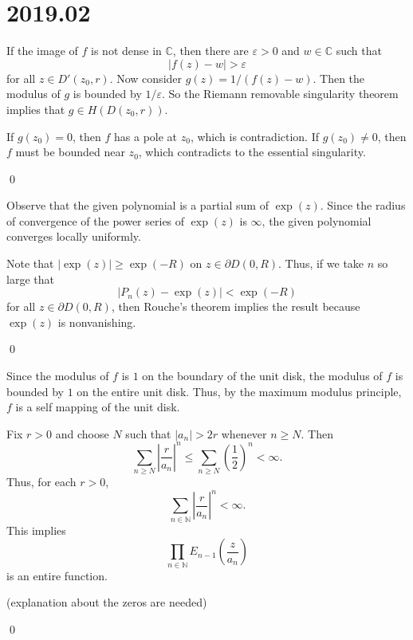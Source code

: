 \section*{2019.02}
\begin{problem}

	If the image of $f$ is not dense in $\mathbb{C}$, then there are $\varepsilon >0$ and $w \in \mathbb{C}$ such that
	\[
		\lvert f(z) - w \lvert > \varepsilon
	\]
	for all $z \in D'(z_0, r)$.
	Now consider $g(z) = 1/(f(z) - w)$.
	Then the modulus of $g$ is bounded by $1/\varepsilon$.
	So the Riemann removable singularity theorem implies that $g \in H(D(z_0, r))$.

	If $g(z_0) = 0$, then $f$ has a pole at $z_0$, which is contradiction.
	If $g(z_0) \ne 0$, then $f$ must be bounded near $z_0$, which contradicts to the essential singularity.

	\qed
\end{problem}

\begin{problem}
	
	Observe that the given polynomial is a partial sum of $\exp(z)$.
	Since the radius of convergence of the power series of $\exp(z)$ is $\infty$,
	the given polynomial converges locally uniformly.

	Note that $ \lvert \exp(z) \lvert \geq \exp(-R)$ on $z \in \partial D(0, R)$.
	Thus, if we take $n$ so large that 
	\[
		\lvert P_n(z) - \exp(z) \lvert < \exp(-R)
	\]
	for all $z \in \partial D(0, R)$, then Rouche's theorem implies the result because $\exp(z)$ is nonvanishing.

	\qed
\end{problem}

\begin{problem}
	
	Since the modulus of $f$ is $1$ on the boundary of the unit disk, the modulus of $f$ is bounded by $1$ on the entire unit disk.
	Thus, by the maximum modulus principle, $f$ is a self mapping of the unit disk.
\end{problem}

\begin{problem}
	
	Fix $r>0$ and choose $N$ such that $\lvert a_n \lvert > 2r$ whenever $n \geq N$.
	Then
	\[
		\sum_{n\geq N} \left \lvert \frac{r}{a_n} \right \lvert ^n \leq \sum_{n\geq N} \left( \frac{1}{2} \right)^n < \infty.
	\]
	Thus, for each $r>0$,
	\[
		\sum_{n \in \mathbb{N}} \left \lvert \frac{r}{a_n} \right \lvert ^n < \infty.
	\]
	This implies
	\[
		\prod_{n \in \mathbb{N}} E_{n-1}\left( \frac{z}{a_n} \right)
	\]
	is an entire function.

	(explanation about the zeros are needed)

	\qed
\end{problem}

